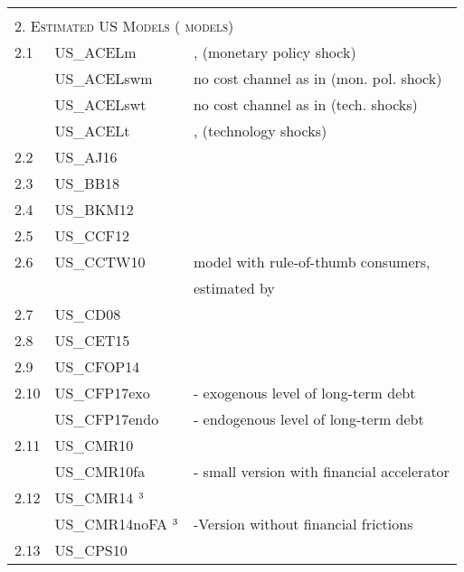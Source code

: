 \documentclass[11pt,a4paper]{article}
\begin{document}
	\begin{table}[H]
		\begin{tabularx}{\textwidth}{lll}
			\hline \hline
			&& \\
			\multicolumn{3}{l}{\textsc{2. Estimated US Models (\the\value{USnumber} models)}} \\
			
			2.1 & US\_ACELm & \cite{AltigChristianoEichenbaumLinde2005}, (monetary policy shock)  \\
			
			& US\_ACELswm & no cost channel as in \cite{TaylorWieland2011} (mon. pol. shock) \\
			
			& US\_ACELswt & no cost channel as in \cite{TaylorWieland2011} (tech. shocks) \\
			
			& US\_ACELt & \cite{AltigChristianoEichenbaumLinde2005}, (technology shocks) \\
			
			2.2 & US\_AJ16 & \cite{ajello2016financial}\\
			2.3 & US\_BB18 & \cite{balke2018oil}\\
			2.4	&	US\_BKM12	&	\cite{bils2012reset}\\	
			2.5&	US\_CCF12	&	\cite{chen2012macroeconomic}\\								
			2.6	&	US\_CCTW10	&	\cite{SmetsWouters2007}	model	with	rule-of-thumb	consumers,\\					
			&&	estimated	by	\cite{CoganCwikTaylorWieland2010}\\
			2.7	&	US\_CD08	&	\cite{ChristensenDib2008}	\\
			2.8	&	US\_CET15	&	\cite{christiano2015eichenbaum}\\									
			2.9	&	US\_CFOP14	&	\cite{Carlstrometal2014}\\									
			2.10	&	US\_CFP17exo	&	\cite{carlstrom2017targeting}	-	exogenous	level	of	long-term	debt\\			
			&	US\_CFP17endo	&	\cite{carlstrom2017targeting}	-	endogenous	level	of	long-term	debt\\			
			2.11	&	US\_CMR10	&	\cite{Christianoetal2010}	\\								
			&	US\_CMR10fa	&	\cite{Christianoetal2010}	-	small	version	with	financial	accelerator	\\		
			2.12	&	US\_CMR14	$	\footnotemark[3]$	&	\cite{CMR2014}	\\					
			&	US\_CMR14noFA	$	\footnotemark[3]$	&	\cite{CMR2014}-Version	without	financial	frictions	\\		
			2.13	&	US\_CPS10	&	\cite{Cogleyetal2010}	\\								
			

\end{tabularx}
\end{table}
\end{document}
